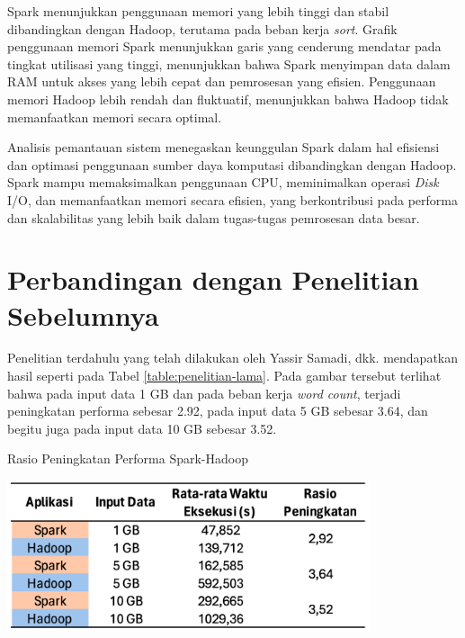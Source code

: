 Spark menunjukkan penggunaan memori yang lebih tinggi dan stabil dibandingkan dengan Hadoop, terutama pada beban kerja \textit{sort}. Grafik penggunaan memori Spark menunjukkan garis yang cenderung mendatar pada tingkat utilisasi yang tinggi, menunjukkan bahwa Spark menyimpan data dalam RAM untuk akses yang lebih cepat dan pemrosesan yang efisien. Penggunaan memori Hadoop lebih rendah dan fluktuatif, menunjukkan bahwa Hadoop tidak memanfaatkan memori secara optimal. 

Analisis pemantauan sistem menegaskan keunggulan Spark dalam hal efisiensi dan optimasi penggunaan sumber daya komputasi dibandingkan dengan Hadoop. Spark mampu memaksimalkan penggunaan CPU, meminimalkan operasi \textit{Disk} I/O, dan memanfaatkan memori secara efisien, yang berkontribusi pada performa dan skalabilitas yang lebih baik dalam tugas-tugas pemrosesan data besar.

\section{Perbandingan dengan Penelitian Sebelumnya \cite{samadiPerformanceComparisonHadoop2018}}
Penelitian terdahulu yang telah dilakukan oleh Yassir Samadi, dkk. mendapatkan hasil seperti pada Tabel \ref{table:penelitian-lama}. Pada gambar tersebut terlihat bahwa pada input data 1 GB dan pada beban kerja \textit{word count}, terjadi peningkatan performa sebesar 2.92, pada input data 5 GB sebesar 3.64, dan begitu juga pada input data 10 GB sebesar 3.52.


\begin{table}[h]
  \centering
  \caption{Rasio Peningkatan Performa Spark-Hadoop \cite{samadiPerformanceComparisonHadoop2018}}
  \includegraphics[width=0.8\textwidth]{figures/ch04/0-penelitian-lama-new}
  \label{table:penelitian-lama}
\end{table}

